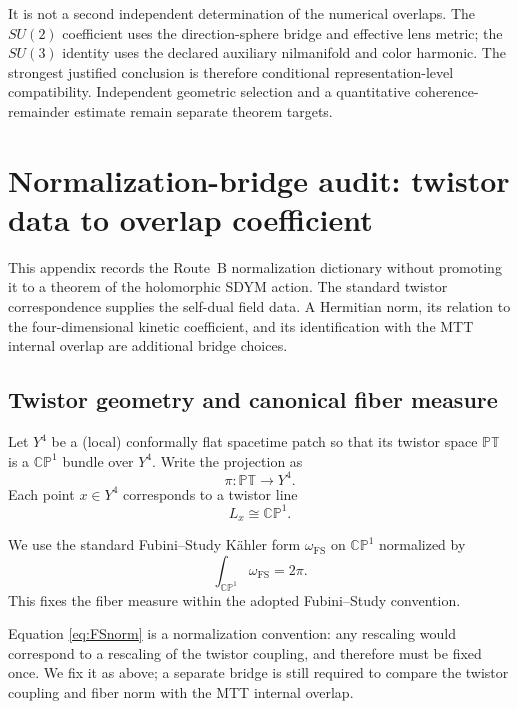\documentclass[11pt]{article}
\begin{document}
It is not a second independent determination of the numerical overlaps.
The $SU(2)$ coefficient uses the direction-sphere bridge and effective lens
metric; the $SU(3)$ identity uses the declared auxiliary nilmanifold and color
harmonic.
The strongest justified conclusion is therefore conditional
representation-level compatibility. Independent geometric selection and a
quantitative coherence-remainder estimate remain separate theorem targets.

\appendix
\section{Normalization-bridge audit: twistor data to overlap coefficient}

This appendix records the Route~B normalization dictionary without promoting
it to a theorem of the holomorphic SDYM action. The standard twistor
correspondence supplies the self-dual field data. A Hermitian norm, its
relation to the four-dimensional kinetic coefficient, and its identification
with the MTT internal overlap are additional bridge choices.

\subsection{Twistor geometry and canonical fiber measure}

Let $Y^4$ be a (local) conformally flat spacetime patch so that its twistor space
$\mathbb{PT}$ is a $\mathbb{CP}^1$ bundle over $Y^4$.
Write the projection as
\[
\pi:\mathbb{PT}\to Y^4.
\]
Each point $x\in Y^4$ corresponds to a twistor line
\[
L_x \cong \mathbb{CP}^1.
\]

We use the standard Fubini--Study K\"ahler form $\omega_{\mathrm{FS}}$ on $\mathbb{CP}^1$
normalized by
\begin{equation}
\int_{\mathbb{CP}^1}\omega_{\mathrm{FS}} = 2\pi.
\label{eq:FSnorm}
\end{equation}
This fixes the fiber measure within the adopted Fubini--Study convention.

\begin{remark}
Equation \eqref{eq:FSnorm} is a normalization convention: any rescaling would
correspond to a rescaling of the twistor coupling, and therefore must be fixed once.
We fix it as above; a separate bridge is still required to compare the twistor
coupling and fiber norm with the MTT internal overlap.
\end{remark}
\end{document}
